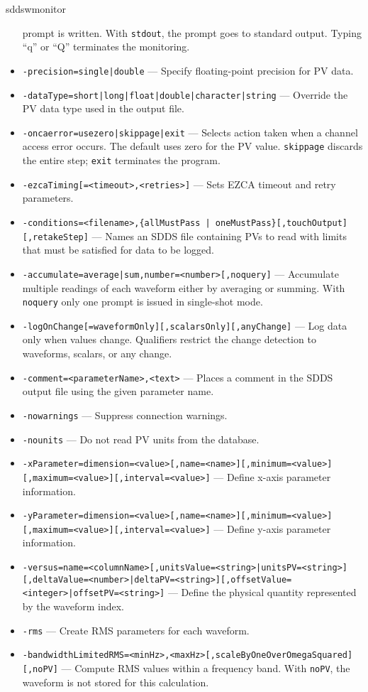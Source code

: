 \begin{sddsprog}{sddswmonitor}
\begin{itemize}
          prompt is written. With \verb+stdout+, the prompt goes to standard
          output. Typing ``q'' or ``Q'' terminates the monitoring.
    \item {\tt -precision={single|double}} --- Specify floating-point
          precision for PV data.
    \item {\tt -dataType={short|long|float|double|character|string}} ---
          Override the PV data type used in the output file.
    \item {\tt -oncaerror={usezero|skippage|exit}} --- Selects action taken
          when a channel access error occurs. The default uses zero for the PV
          value. \verb+skippage+ discards the entire step; \verb+exit+ terminates
          the program.
    \item {\tt -ezcaTiming[=<timeout>,<retries>]} --- Sets EZCA timeout and
          retry parameters.
    \item {\verb+-conditions=<filename>,{allMustPass | oneMustPass}[,touchOutput][,retakeStep]+} ---
          Names an SDDS file containing PVs to read with limits that must be
          satisfied for data to be logged.
    \item {\tt -accumulate={average|sum},number=<number>[,noquery]} ---
          Accumulate multiple readings of each waveform either by averaging or
          summing. With \verb+noquery+ only one prompt is issued in single-shot
          mode.
    \item {\tt -logOnChange[=waveformOnly][,scalarsOnly][,anyChange]} --- Log
          data only when values change. Qualifiers restrict the change detection
          to waveforms, scalars, or any change.
    \item {\verb+-comment=<parameterName>,<text>+} --- Places a comment in the
          SDDS output file using the given parameter name.
    \item {\tt -nowarnings} --- Suppress connection warnings.
    \item {\tt -nounits} --- Do not read PV units from the database.
    \item {\tt -xParameter=dimension=<value>[,name=<name>][,minimum=<value>][,maximum=<value>][,interval=<value>]} ---
          Define x-axis parameter information.
    \item {\tt -yParameter=dimension=<value>[,name=<name>][,minimum=<value>][,maximum=<value>][,interval=<value>]} ---
          Define y-axis parameter information.
    \item {\tt -versus=name=<columnName>[,unitsValue=<string>|unitsPV=<string>][,deltaValue=<number>|deltaPV=<string>][,offsetValue=<integer>|offsetPV=<string>]} ---
          Define the physical quantity represented by the waveform index.
    \item {\tt -rms} --- Create RMS parameters for each waveform.
    \item {\tt -bandwidthLimitedRMS=<minHz>,<maxHz>[,scaleByOneOverOmegaSquared][,noPV]} ---
          Compute RMS values within a frequency band. With \verb+noPV+, the
          waveform is not stored for this calculation.
  \end{itemize}


\end{sddsprog}
